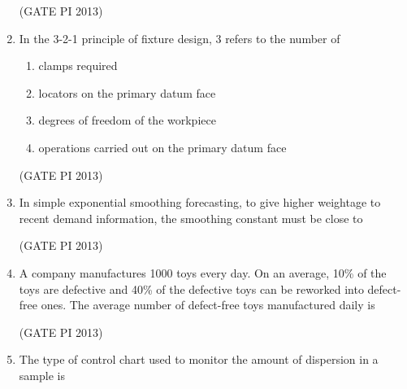 \documentclass[journal,12pt,onecolumn]{IEEEtran}
\theoremstyle{remark}
\begin{document}
\begin{enumerate}
\hfill (GATE PI 2013)

\item In the 3-2-1 principle of fixture design, 3 refers to the number of
\begin{enumerate}
\item clamps required
\item locators on the primary datum face
\item degrees of freedom of the workpiece
\item operations carried out on the primary datum face \\
\end{enumerate}

\hfill (GATE PI 2013)

\item In simple exponential smoothing forecasting, to give higher weightage to recent demand information, the smoothing constant must be close to

\begin{enumerate}
\end{enumerate}

\hfill (GATE PI 2013)

\item A company manufactures 1000 toys every day. On an average, 10\% of the toys are defective and 40\% of the defective toys can be reworked into defect-free ones. The average number of defect-free toys manufactured daily is \\

\begin{enumerate}
\end{enumerate}

\hfill (GATE PI 2013)

\item The type of control chart used to monitor the amount of dispersion in a sample is

\begin{enumerate}
\end{enumerate}


\end{enumerate}
\end{document}
